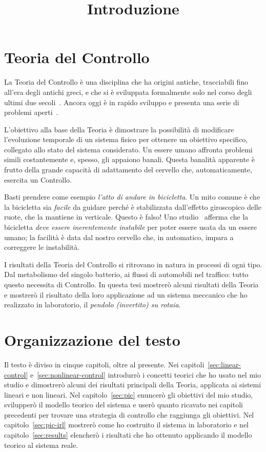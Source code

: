 
\title{Introduzione}
\maketitle
\label{sec:intro}


\section{Teoria del Controllo}
La Teoria del Controllo è una disciplina che ha origini antiche,
tracciabili fino all'era degli antichi greci,
e che si è sviluppata formalmente solo nel corso degli ultimi due secoli~\cite{history}.
Ancora oggi è in rapido sviluppo e presenta una serie di problemi aperti~\cite{blondel1999open}.

L'obiettivo alla base della Teoria è
dimostrare la possibilità di modificare l'evoluzione
temporale di un sistema fisico per ottenere un 
obiettivo specifico, collegato allo stato del sistema
considerato.
Un essere umano affronta problemi simili
costantemente e, spesso, gli appaiono banali.
Questa banalità apparente è frutto
della grande capacità di adattamento del
cervello che, automaticamente,
esercita un Controllo.

Basti prendere come esempio \emph{l'atto di andare in bicicletta}.
Un mito comune è che la bicicletta sia \emph{facile} da guidare perché
è stabilizzata dall'effetto giroscopico delle ruote, che la mantiene in verticale.
Questo è falso!
Uno studio~\cite{bicycle}
afferma che la bicicletta \emph{deve essere inerentemente instabile} per poter
essere usata da un essere umano; la facilità è data dal nostro cervello che,
in automatico, impara a correggere le instabilità.

I risultati della Teoria del Controllo si ritrovano in natura in processi di ogni tipo.
Dal metabolismo del singolo batterio, ai flussi di automobili nel traffico:
tutto questo necessita di Controllo.
In questa tesi mostrerò alcuni risultati della Teoria e
mostrerò il risultato della loro applicazione ad un sistema
meccanico che ho realizzato in laboratorio, il \emph{pendolo (invertito) su rotaia}.

\section{Organizzazione del testo}
Il testo è diviso in cinque capitoli, oltre al presente.
Nei capitoli~\ref{sec:linear-control} e~\ref{sec:nonlinear-control} introdurrò
i concetti teorici che ho usato nel mio studio e dimostrerò alcuni dei risultati
principali della Teoria, applicata ai sistemi lineari e non lineari.
Nel capitolo~\ref{sec:pic} enuncerò gli obiettivi del mio studio, svilupperò il modello
teorico del sistema e userò quanto ricavato nei capitoli
precedenti per trovare una strategia di controllo che raggiunga gli obiettivi.
Nel capitolo~\ref{sec:pic-irl} mostrerò come ho costruito il sistema in laboratorio
e nel capitolo~\ref{sec:results} elencherò i risultati che ho ottenuto applicando
il modello teorico al sistema reale.

